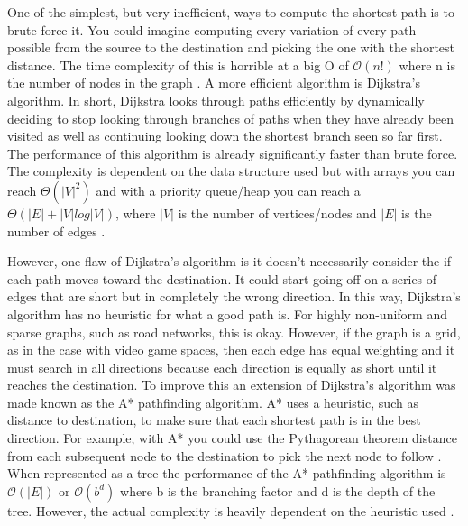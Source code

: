 \documentclass[letterpaper,12pt]{article}  %
\begin{document}

One of the simplest, but very inefficient, ways to compute the shortest path is 
to brute force it. You could imagine computing every variation of every path 
possible from the source to the destination and picking the one with the 
shortest distance. The time complexity of this is horrible at a big O of 
$\mathcal{O}(n!)$ where n is the number of nodes in the graph 
\cite{TravellingSalesmanProblem2022}. A more efficient algorithm is Dijkstra’s 
algorithm. In short, Dijkstra looks through paths efficiently by dynamically 
deciding to stop looking through branches of paths when they have already been 
visited as well as continuing looking down the shortest branch seen so far 
first. The performance of this algorithm is already significantly faster than 
brute force. The complexity is dependent on the data structure used but with 
arrays you can reach $\Theta(|V|^2)$ and with a priority queue/heap you can 
reach a  $\Theta(|E| + |V|log|V|)$, where $|V|$ is the number of 
vertices/nodes and $|E|$ is the number of edges \cite{DijkstraAlgorithm2022}.

However, one flaw of Dijkstra’s algorithm is it doesn’t necessarily consider 
the if each path moves toward the destination. It could start going off on a 
series of edges that are short but in completely the wrong direction. In this 
way, Dijkstra’s algorithm has no heuristic for what a good path is. For highly 
non-uniform and sparse graphs, such as road networks, this is okay. However, if 
the graph is a grid, as in the case with video game spaces, then each edge has 
equal weighting and it must search in all directions because each direction is 
equally as short until it reaches the destination. To improve this an extension 
of Dijkstra’s algorithm was made known as the A* pathfinding algorithm. A* uses 
a heuristic, such as distance to destination, to make sure that each shortest 
path is in the best direction. For example, with A* you could use the 
Pythagorean theorem distance from each subsequent node to the destination to 
pick the next node to follow \cite{computerphileStarSearchAlgorithm2017}. When 
represented as a tree the performance of the A* pathfinding algorithm is 
$\mathcal{O}(|E|)$ or $\mathcal{O}(b^d)$ where b is the branching factor and d 
is the depth of the tree. However, the actual complexity is heavily dependent 
on the heuristic used \cite{SearchAlgorithm2022, AlgorithmsGraphSearch}.
\end{document}
